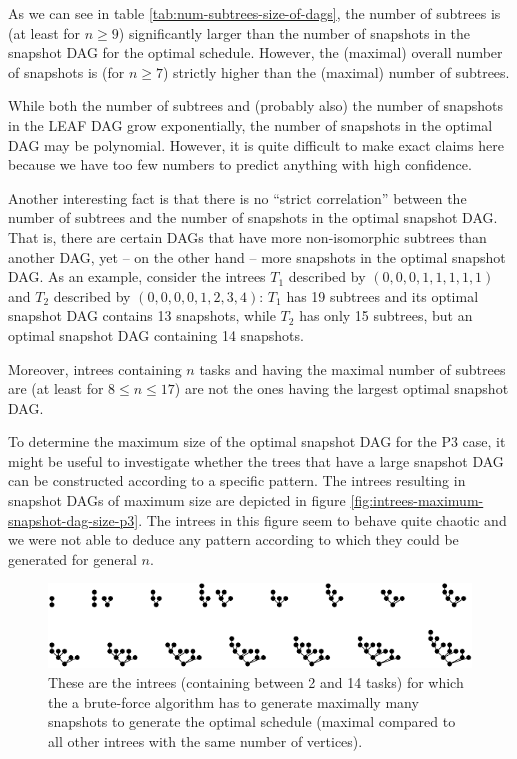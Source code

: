 As we can see in table \ref{tab:num-subtrees-size-of-dags}, the number of subtrees is (at least for $n\geq  9$) significantly larger than the number of snapshots in the snapshot DAG for the optimal schedule. However, the (maximal) overall number of snapshots is (for $n\geq 7$) strictly higher than the (maximal) number of subtrees.

While both the number of subtrees and (probably also) the number of snapshots in the LEAF DAG grow exponentially, the number of snapshots in the optimal DAG may be polynomial. However, it is quite difficult to make exact claims here because we have too few numbers to predict anything with high confidence.

Another interesting fact is that there is no ``strict correlation'' between the number of subtrees and the number of snapshots in the optimal snapshot DAG. That is, there are certain DAGs that have more non-isomorphic subtrees than another DAG, yet -- on the other hand -- more snapshots in the optimal snapshot DAG. As an example, consider the intrees $T_1$ described by $(0,0,0,1,1,1,1,1)$ and $T_2$ described by $(0,0,0,0,1,2,3,4)$: $T_1$ has 19 subtrees and its optimal snapshot DAG contains 13 snapshots, while $T_2$ has only 15 subtrees, but an optimal snapshot DAG containing 14 snapshots.

Moreover, intrees containing $n$ tasks and having the maximal number of subtrees are (at least for $8\leq n \leq 17$) are not the ones having the largest optimal snapshot DAG.

To determine the maximum size of the optimal snapshot DAG for the P3 case, it might be useful to investigate whether the trees that have a large snapshot DAG can be constructed according to a specific pattern. The intrees resulting in snapshot DAGs of maximum size are depicted in figure \ref{fig:intrees-maximum-snapshot-dag-size-p3}. The intrees in this figure seem to behave quite chaotic and we were not able to deduce any pattern according to which they could be generated for general $n$.

\begin{figure}[t]
  \centering
  \includegraphics[scale=1.4]{p3/max_unoptimized.pdf}
  \caption{These are the intrees (containing between 2 and 14 tasks) for which the a brute-force algorithm has to generate maximally many snapshots to generate the optimal schedule (maximal compared to all other intrees with the same number of vertices).}
  \label{fig:intrees-maximum-unoptimized-p3}
\end{figure}

